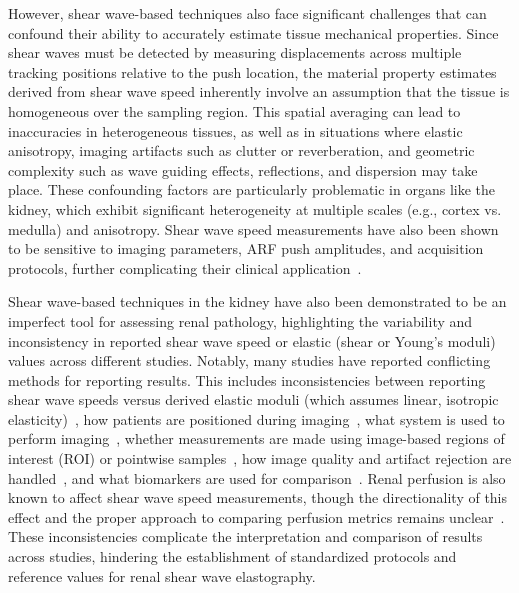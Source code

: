 
However, shear wave-based techniques also face significant challenges that can confound their ability to accurately estimate tissue mechanical properties. Since shear waves must be detected by measuring displacements across multiple tracking positions relative to the push location, the material property estimates derived from shear wave speed inherently involve an assumption that the tissue is homogeneous over the sampling region. This spatial averaging can lead to inaccuracies in heterogeneous tissues, as well as in situations where elastic anisotropy, imaging artifacts such as clutter or reverberation, and geometric complexity such as wave guiding effects, reflections, and dispersion may take place. These confounding factors are particularly problematic in organs like the kidney, which exhibit significant heterogeneity at multiple scales (e.g., cortex vs. medulla) and anisotropy. Shear wave speed measurements have also been shown to be sensitive to imaging parameters, ARF push amplitudes, and acquisition protocols, further complicating their clinical application~\cite{palmeri_Radiological_2021,elmeliegy_Correlationbased_2023}.

Shear wave-based techniques in the kidney have also been demonstrated to be an imperfect tool for assessing renal pathology, highlighting the variability and inconsistency in reported shear wave speed or elastic (shear or Young's moduli) values across different studies. Notably, many studies have reported conflicting methods for reporting results. This includes inconsistencies between reporting shear wave speeds versus derived elastic moduli (which assumes linear, isotropic elasticity)~\cite{ce_Ultrasound_2023,ng_Shear_2024,urban_Novel_2021}, how patients are positioned during imaging~\cite{ce_Ultrasound_2023}, what system is used to perform imaging~\cite{ng_Shear_2024}, whether measurements are made using image-based regions of interest (ROI) or pointwise samples~\cite{sandhya_Role_2025}, how image quality and artifact rejection are handled~\cite{ce_Ultrasound_2023,barr_Can_2020}, and what biomarkers are used for comparison~\cite{alnazer_Recent_2021,cao_Shear_2023}. Renal perfusion is also known to affect shear wave speed measurements, though the directionality of this effect and the proper approach to comparing perfusion metrics remains unclear~\cite{alnazer_Recent_2021,filipov_Investigating_2024,leong_Comparison_2019,lim_Shear_2021,ozkan_Interobserver_2013,urban_Novel_2021}. These inconsistencies complicate the interpretation and comparison of results across studies, hindering the establishment of standardized protocols and reference values for renal shear wave elastography.

